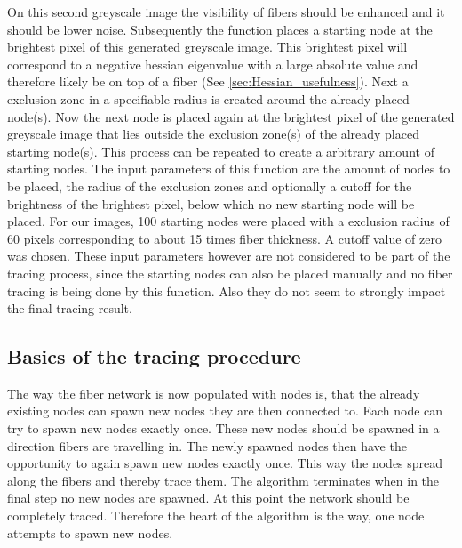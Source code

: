 \documentclass[12pt,english,twocolumn]{revtex4}
\begin{document}
On this second greyscale image the visibility of fibers should be enhanced and it should be lower noise. Subsequently the function places a starting node at the brightest pixel of this generated greyscale image. This brightest pixel will correspond to a negative hessian eigenvalue with a large absolute value and therefore likely be on top of a fiber (See \ref{sec:Hessian_usefulness}). Next a exclusion zone in a specifiable radius is created around the already placed node(s). Now the next node is placed again at the brightest pixel of the generated greyscale image that lies outside the exclusion zone(s) of the already placed starting node(s). This process can be repeated to create a arbitrary amount of starting nodes. The input parameters of this function are the amount of nodes to be placed, the radius of the exclusion zones and optionally a cutoff for the brightness of the brightest pixel, below which no new starting node will be placed. For our images, 100 starting nodes were placed with a exclusion radius of 60 pixels corresponding to about 15 times fiber thickness. A cutoff value of zero was chosen. These input parameters however are not considered to be part of the tracing process, since the starting nodes can also be placed manually and no fiber tracing is being done by this function. Also they do not seem to strongly impact the final tracing result.
\subsection{Basics of the tracing procedure}
The way the fiber network is now populated with nodes is, that the already existing nodes can spawn new nodes they are then connected to. Each node can try to spawn new nodes exactly once. These new nodes should be spawned in a direction fibers are travelling in. The newly spawned nodes then have the opportunity to again spawn new nodes exactly once. This way the nodes spread along the fibers and thereby trace them. The algorithm terminates when in the final step no new nodes are spawned. At this point the network should be completely traced. Therefore the heart of the algorithm is the way, one node attempts to spawn new nodes.
\end{document}
